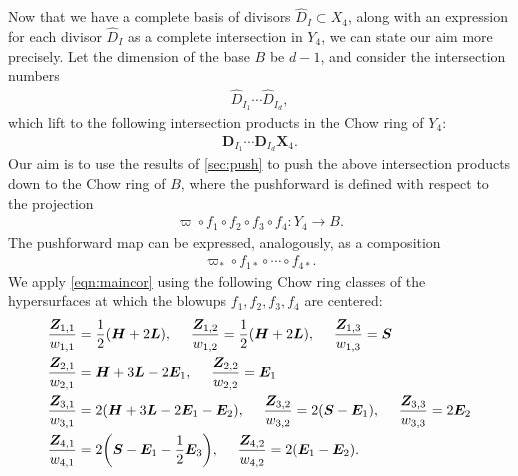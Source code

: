 \documentclass[11pt,oneside,english]{article}
\numberwithin{equation}{section}
\let\originalleft\left
\let\originalright\right
\renewcommand*{\left}{\mathopen{}\mathclose\bgroup\originalleft}
\renewcommand*{\right}{\aftergroup\egroup\originalright}
\theoremstyle{definition}
\begin{document}
Now that we have a complete basis of divisors $\hat D_I \subset X_4$, along with an expression for each divisor $\hat D_I$ as a complete intersection in $Y_4$, we can state our aim more precisely. Let the dimension of the base $B$ be $d-1$, and consider the intersection numbers
	\begin{align}
	\label{eqn:X4intersection}
		\hat D_{I_1} \cdots \hat D_{I_d},
		\end{align}
which lift to the following intersection products in the Chow ring of $Y_4$:
	\begin{align} 
		\label{eqn:Y4intersection}
		\boldsymbol{D}_{I_1} \cdots \boldsymbol{D}_{I_d}  \boldsymbol{X}_4.
	\end{align}
Our aim is to use the results of \cref{sec:push} to push the above intersection products down to the Chow ring of $B$, where the pushforward is defined with respect to the projection
	\begin{align}
		\varpi \circ f_1 \circ f_2 \circ f_3 \circ f_4 : Y_4 \rightarrow B.
	\end{align}
	 The pushforward map can be expressed, analogously, as a composition
	\begin{align}
	\label{eqn:SU5pushmap}
		\varpi_* \circ f_{1*} \circ \cdots \circ f_{4*}. 
	\end{align}
We apply \cref{eqn:maincor} using the following Chow ring classes of the hypersurfaces at which the blowups $f_1,f_2,f_3,f_4$ are centered:
	\begin{align}
	\begin{split}
	\label{eqn:generators}
		\frac{\boldsymbol{Z}_{1,1}}{w_{1,1}} &= \frac{1}{2} (\boldsymbol{H} + 2 \boldsymbol{L}),~~~~ \frac{\boldsymbol{Z}_{1,2}}{w_{1,2}} = \frac{1}{2} (\boldsymbol{H} + 2 \boldsymbol{L}),~~~~ \frac{\boldsymbol{Z}_{1,3}}{w_{1,3}}= \boldsymbol{S}\\
		\frac{\boldsymbol{Z}_{2,1}}{w_{2,1}} &= \boldsymbol{H}+ 3 \boldsymbol{L} - 2 \boldsymbol{E}_1,~~~~ \frac{\boldsymbol{Z}_{2,2}}{w_{2,2}} = \boldsymbol{E}_1 \\
		\frac{\boldsymbol{Z}_{3,1}}{w_{3,1}} &= 2 \left(\boldsymbol{H}+3 \boldsymbol{L}-2 \boldsymbol{E}_1-\boldsymbol{E}_2\right),~~~~  \frac{\boldsymbol{Z}_{3,2}}{w_{3,2}} =2 (\boldsymbol{S}-\boldsymbol{E}_1),~~~~\frac{\boldsymbol{Z}_{3,3}}{w_{3,3}} = 2 \boldsymbol{E}_2 \\
		\frac{\boldsymbol{Z}_{4,1}}{w_{4,1}}  &=2 \left(\boldsymbol{S}-\boldsymbol{E}_1-\frac{1}{2} \boldsymbol{E}_3\right),~~~~ \frac{\boldsymbol{Z}_{4,2}}{w_{4,2}} = 2 (\boldsymbol{E}_1 - \boldsymbol{E}_2).
	\end{split}
	\end{align}
\end{document}
